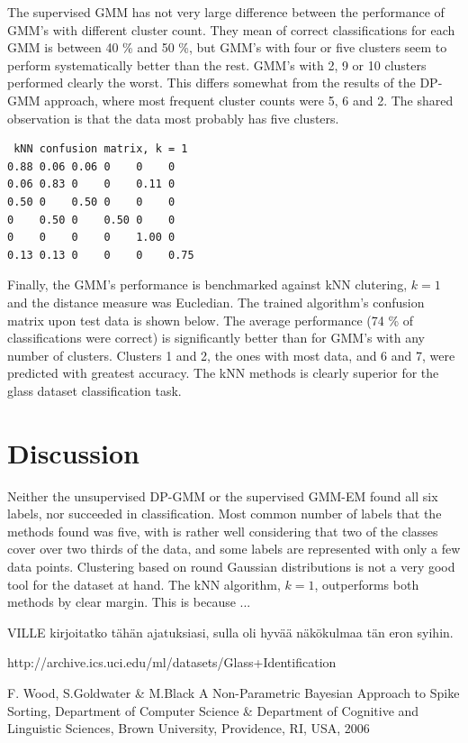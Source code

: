 \documentclass[a4paper]{article}
\begin{document}
\par
The supervised GMM has not very large difference between the performance of
GMM's with different cluster count. They mean of correct classifications for
each GMM is between 40 \% and 50 \%, but GMM's with four or five clusters seem
to perform systematically better than the rest. GMM's with 2, 9 or 10 clusters
performed clearly the worst. This differs somewhat from the results of the
DP-GMM approach, where most frequent cluster counts were 5, 6 and 2. The shared
observation is that the data most probably has five clusters.

\begin{verbatim}
 kNN confusion matrix, k = 1
0.88 0.06 0.06 0    0    0   
0.06 0.83 0    0    0.11 0   
0.50 0    0.50 0    0    0   
0    0.50 0    0.50 0    0   
0    0    0    0    1.00 0   
0.13 0.13 0    0    0    0.75
\end{verbatim}

\par
Finally, the GMM's performance is benchmarked against kNN clutering, $ k = 1 $
and the distance measure was Eucledian. The trained algorithm's confusion
matrix upon test data is shown below. The average performance (74 \% of
classifications were correct) is significantly better than for GMM's with any
number of clusters. Clusters 1 and 2, the ones with most data, and 6 and 7,
were predicted with greatest accuracy. The kNN methods is clearly superior for
the glass dataset classification task.

\section{Discussion}

Neither the unsupervised DP-GMM or the supervised GMM-EM found all six labels,
nor succeeded in classification. Most common number of labels that the methods
found was five, with is rather well considering that two of the classes
cover over two thirds of the data, and some labels are represented with only
a few data points. Clustering based on round Gaussian distributions is not
a very good tool for the dataset at hand. The kNN algorithm, $ k = 1 $,
outperforms both methods by clear margin. This is because ...

\par

VILLE kirjoitatko tähän ajatuksiasi, sulla oli hyvää näkökulmaa tän eron syihin.

\par
[1] http://archive.ics.uci.edu/ml/datasets/Glass+Identification
\par
[2] F. Wood, S.Goldwater \& M.Black A Non-Parametric Bayesian Approach to Spike Sorting, Department of Computer Science \& Department of Cognitive and Linguistic Sciences, Brown University, Providence, RI, USA, 2006
\end{document}
